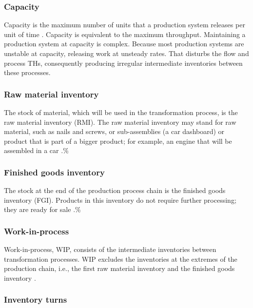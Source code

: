 \documentclass{article}
\begin{document}
\subsubsection{Capacity}
\label{sec:orga589561}

Capacity is the maximum number of units that a production system releases per unit of time \citep{Hopp2001}.
Capacity is equivalent to the maximum throughput.
Maintaining a production system at capacity is complex.
Because most production systems are unstable at capacity, releasing work at unsteady rates.
That disturbs the flow and process THs, consequently producing irregular intermediate inventories between these processes.

\subsubsection{Raw material inventory}
\label{sec:orga3d84d3}

The stock of material, which will be used in the transformation process, is the raw material inventory (RMI).
The raw material inventory may stand for raw material, such as nails and screws, or sub-assemblies (a car dashboard) or product that is part of a bigger product; for example, an engine that will be assembled in a car \citep{Hopp2001}.\%\citep[p.217]{Hopp2001}

\subsubsection{Finished goods inventory}
\label{sec:org9a32df3}

The stock at the end of the production process chain is the finished goods inventory (FGI).
Products in this inventory do not require further processing; they are ready for sale \citep{Hopp2001}.\%\citep[p.217]{Hopp2001}

\subsubsection{Work-in-process}
\label{sec:org368b8ac}

Work-in-process, WIP, consists of the intermediate inventories between transformation processes.
WIP excludes the inventories at the extremes of the production chain, i.e., the first raw material inventory and the finished goods inventory \citep{Hopp2001}.

\subsubsection{Inventory turns}
\label{sec:orgab0c258}
\end{document}
